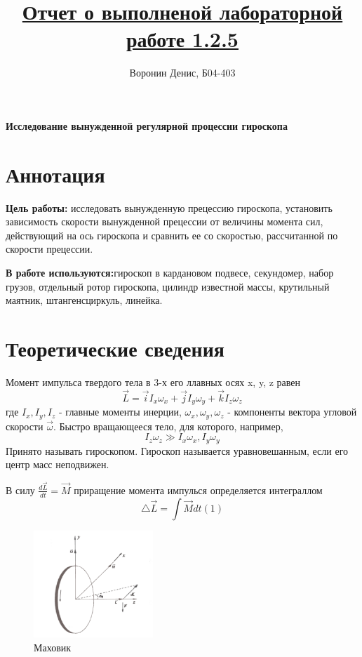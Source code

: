 \documentclass[a4paper]{article}
\title{\underline{Отчет о выполненой лабораторной работе 1.2.5}}
\author{Воронин Денис, Б04-403}
\begin{document}
\maketitle
\begin{center}
    \textbf{Исследование вынужденной регулярной процессии гироскопа}
\end{center}

\section{Аннотация}
\textbf{Цель работы:}  исследовать вынужденную прецессию гироскопа, установить зависимость скорости вынужденной прецессии от величины момента сил, действующий на ось гироскопа и сравнить ее со скоростью, рассчитанной по скорости прецессии.\par

\textbf{В работе используются:}гироскоп в кардановом подвесе, секундомер, набор грузов, отдельный ротор гироскопа, цилиндр известной массы, крутильный маятник, штангенсциркуль, линейка.\par
	
\section{Теоретические сведения}

Момент импульса твердого тела в 3-х его ллавных осях x, y, z равен
\[\overrightarrow{L} = \overrightarrow{i}I_{x}\omega_{x} + \overrightarrow{j}I_{y}\omega_{y} + \overrightarrow{k}I_{z}\omega_{z}\] 
где $I_{x}, I_{y}, I_{z}$ - главные моменты инерции, $\omega_{x},\omega_{y},\omega_{z}$ - компоненты вектора угловой скорости $\overrightarrow{\omega}$. Быстро вращающееся тело, для которого, например, 
\[I_{z}\omega_{z} \gg  I_{x}\omega_{x}, I_{y}\omega_{y}\]
Принято называть гироскопом. Гироскоп называется уравновешанным, если его центр масс неподвижен. \par
В силу $\frac{d\overrightarrow{L} }{dt} = \overrightarrow{M}  $ приращение момента импулься определяется интеграллом
\[\bigtriangleup \overrightarrow{L} = \int\overrightarrow{M}dt (1)\] 

\begin{figure}
    \centering
    \includegraphics[width=0.4\textwidth]{pick1.PNG}
    \caption{Маховик}
\end{figure}
\end{document}
